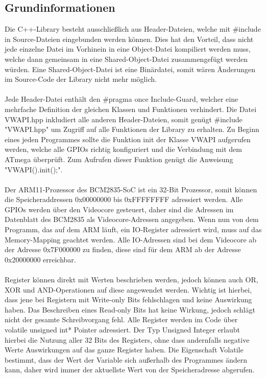\documentclass[12pt]{article}
\begin{document}
\subsection{Grundinformationen}
Die C++-Library besteht ausschließlich aus Header-Dateien, welche mit \#include in Source-Dateien eingebunden werden können. Dies hat den Vorteil, dass nicht jede einzelne Datei im Vorhinein in eine Object-Datei kompiliert werden muss, welche dann gemeinsam in eine Shared-Object-Datei zusammengefügt werden würden. Eine Shared-Object-Datei ist eine Binärdatei, somit wären Änderungen im Source-Code der Library nicht mehr möglich.
\\\\Jede Header-Datei enthält den \#pragma once Include-Guard, welcher eine mehrfache Definition der gleichen Klassen und Funktionen verhindert. Die Datei VWAPI.hpp inkludiert alle anderen Header-Dateien, somit genügt \#include "VWAPI.hpp" um Zugriff auf alle Funktionen der Library zu erhalten. Zu Beginn eines jeden Programmes sollte die Funktion init der Klasse VWAPI aufgerufen werden, welche alle GPIOs richtig konfiguriert und die Verbindung mit dem ATmega überprüft. Zum Aufrufen dieser Funktion genügt die Anweisung "VWAPI().init();".
\\\\Der ARM11-Prozessor des BCM2835-SoC ist ein 32-Bit Prozessor, somit können die Speicheraddressen 0x00000000 bis 0xFFFFFFFF adressiert werden. Alle GPIOs werden über den Videocore gesteuert, daher sind die Adressen im Datenblatt des BCM2835 als Videocore-Adressen angegeben. Wenn nun von dem Programm, das auf dem ARM läuft, ein IO-Register adressiert wird, muss auf das Memory-Mapping geachtet werden. Alle IO-Adressen sind bei dem Videocore ab der Adresse 0x7F000000 zu finden, diese sind für dem ARM ab der Adresse 0x20000000 erreichbar.
\\\\Register können direkt mit Werten beschrieben werden, jedoch können auch OR, XOR und AND-Operationen auf diese angewendet werden. Wichtig ist hierbei, dass jene bei Registern mit Write-only Bits fehlschlagen und keine Auswirkung haben. Das Beschreiben eines Read-only Bits hat keine Wirkung, jedoch schlägt nicht der gesamte Schreibvorgang fehl. Alle Register werden im Code über volatile unsigned int* Pointer adressiert. Der Typ Unsigned Integer erlaubt hierbei die Nutzung aller 32 Bits des Registers, ohne dass andernfalls negative Werte Auswirkungen auf das ganze Register haben. Die Eigenschaft Volatile bestimmt, dass der Wert der Variable sich außerhalb des Programmes ändern kann, daher wird immer der aktuellste Wert von der Speicheradresse abgerufen.
\end{document}
